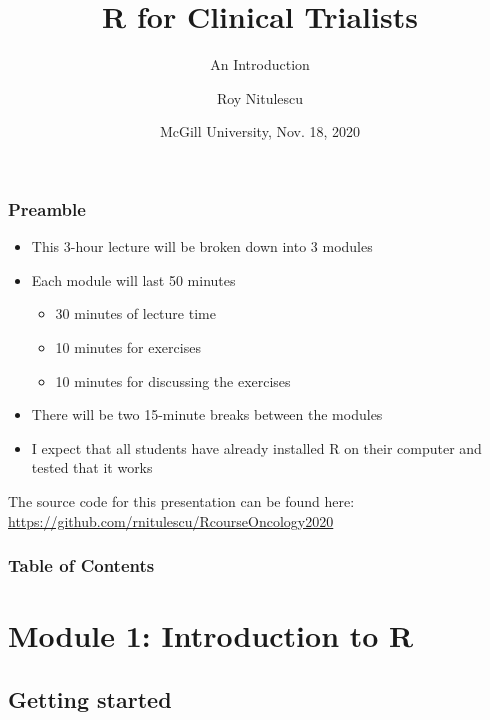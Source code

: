 \documentclass{beamer}
\title{R for Clinical Trialists}
\subtitle{An Introduction}
\author{Roy Nitulescu\inst{1}}
\institute
{
    \inst{1}%
    CITADEL\\
    CR-CHUM
}
\date[McGill, Nov. 18, 2020]{McGill University, Nov. 18, 2020}
\begin{document}

\frame{\titlepage}


\begin{frame}
    \frametitle{Preamble}
    \begin{itemize}
      \item This 3-hour lecture will be broken down into 3 modules
      \item Each module will last 50 minutes
      \begin{itemize}
        \item 30 minutes of lecture time
        \item 10 minutes for exercises
        \item 10 minutes for discussing the exercises
      \end{itemize}
      \item There will be two 15-minute breaks between the modules
      \item I expect that all students have already installed R on their computer and tested that it works
    \end{itemize}
    
    \vfill
    
    The source code for this presentation can be found here:\\
    \url{https://github.com/rnitulescu/RcourseOncology2020}
\end{frame}


\begin{frame}
    \frametitle{Table of Contents}
    \tableofcontents
\end{frame}



\section{Module 1: Introduction to R}

\subsection{Getting started}
\end{document}

